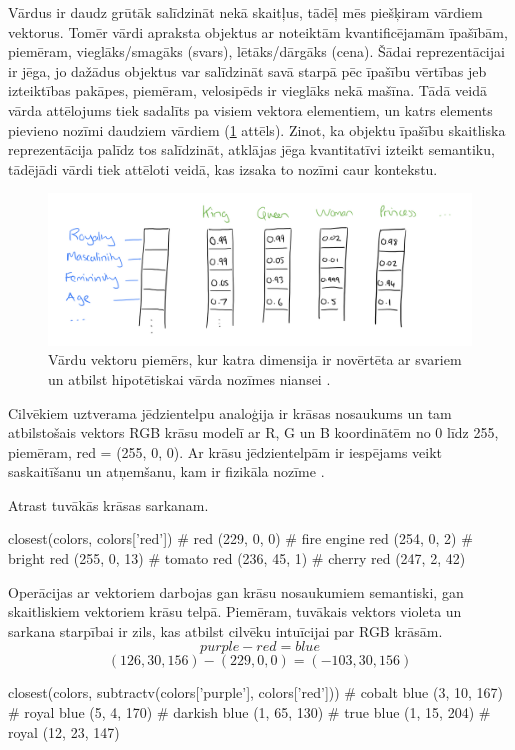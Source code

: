 Vārdus ir daudz grūtāk salīdzināt nekā skaitļus, tādēļ mēs piešķiram vārdiem vektorus. Tomēr vārdi apraksta objektus ar noteiktām kvantificējamām īpašībām, piemēram, vieglāks/smagāks (svars), lētāks/dārgāks (cena). Šādai reprezentācijai ir jēga, jo dažādus objektus var salīdzināt savā starpā pēc īpašību vērtības jeb izteiktības pakāpes, piemēram, velosipēds ir vieglāks nekā mašīna. Tādā veidā vārda attēlojums tiek sadalīts pa visiem vektora elementiem, un katrs elements pievieno nozīmi daudziem vārdiem (\ref{fig:distributed-representation} attēls). Zinot, ka objektu īpašību skaitliska reprezentācija palīdz tos salīdzināt, atklājas jēga kvantitatīvi izteikt semantiku, tādējādi vārdi tiek attēloti veidā, kas izsaka to nozīmi caur kontekstu. 

\begin{figure}[h]
	\centering
	\includegraphics[width=\textwidth]{figures/word2vec-distributed-representation.png}
	\caption{Vārdu vektoru piemērs, kur katra dimensija ir novērtēta ar svariem un atbilst hipotētiskai vārda nozīmes niansei \cite{colyer2016}.}
	\label{fig:distributed-representation}
\end{figure}

Cilvēkiem uztverama jēdzientelpu analoģija ir krāsas nosaukums un tam atbilstošais vektors RGB krāsu modelī ar R, G un B koordinātēm no 0 līdz 255, piemēram, red = (255, 0, 0). Ar krāsu jēdzientelpām ir iespējams veikt saskaitīšanu un atņemšanu, kam ir fizikāla nozīme \cite{parrish2017}.

Atrast tuvākās krāsas sarkanam.
\begin{python}
closest(colors, colors['red'])
# red (229, 0, 0)
# fire engine red (254, 0, 2)
# bright red (255, 0, 13)
# tomato red (236, 45, 1)
# cherry red (247, 2, 42)
\end{python}

Operācijas ar vektoriem darbojas gan krāsu nosaukumiem semantiski, gan skaitliskiem vektoriem krāsu telpā. Piemēram, tuvākais vektors violeta un sarkana starpībai ir zils, kas atbilst cilvēku intuīcijai par RGB krāsām.
$$purple - red = blue$$
$$(126, 30, 156) - (229, 0, 0) = (-103, 30, 156)$$
\begin{python}
closest(colors, subtractv(colors['purple'], colors['red']))
# cobalt blue (3, 10, 167)
# royal blue (5, 4, 170)
# darkish blue (1, 65, 130)
# true blue (1, 15, 204)
# royal (12, 23, 147)
\end{python}

